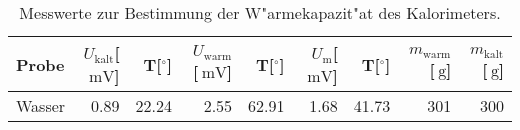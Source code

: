 \begin{table}[!h]
\begin{center}
\begin{tabular}{|l|r|r|r|r|r|r|r|r|}
\hline
Probe & $U_\mathrm{kalt}$[$\SI{}{\milli\volt}$] & T[$^\circ$] & $U_\mathrm{warm}$[$\SI{}{\milli\volt}$] & T[$^\circ$] & $U_\mathrm{m}$[$\SI{}{\milli\volt}$] & T[$^\circ$] & $m_\mathrm{warm}$[$\SI{}{\gram}$] & $m_\mathrm{kalt}$[$\SI{}{\gram}$]\\
\hline
\hline
Wasser & 0.89 & 22.24 & 2.55 & 62.91 & 1.68 & 41.73 & 301 & 300 \\
\hline
\end{tabular}
\caption[]{Messwerte zur Bestimmung der W"armekapazit"at des Kalorimeters.}
\label{kalo}
\end{center}
\end{table}
